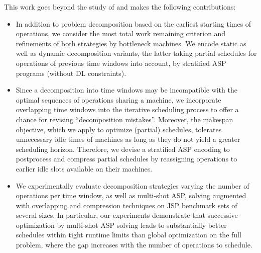 \documentclass{tlp} %
\begin{document}
This work goes beyond the study of \cite{elkgeb20a} and makes the following contributions:
\begin{itemize}
\item In addition to problem decomposition based on the earliest starting times
      of operations, we consider the most total work remaining criterion and
      refinements of both strategies by bottleneck machines.
      We encode static as well as dynamic decomposition variants, the latter taking
      partial schedules for operations of previous time windows into account, by stratified
      ASP programs (without DL constraints).
\item Since a decomposition into time windows may be incompatible with
      the optimal sequences of operations sharing a machine, we incorporate
      overlapping time windows into the iterative scheduling process to
      offer a chance for revising ``decomposition mistakes''.
      Moreover, the makespan objective, which we apply to optimize (partial) schedules, tolerates unnecessary idle times of machines as long as they do not yield a greater scheduling horizon. 
      Therefore, we devise a stratified ASP encoding to postprocess and compress partial schedules by reassigning operations to earlier idle slots available on their machines.
\item We experimentally evaluate decomposition strategies varying the number of
      operations per time window, as well as multi-shot ASP, solving
      augmented with overlapping and compression techniques
      on JSP benchmark sets of several sizes.
      In particular, our experiments demonstrate that successive optimization
      by multi-shot ASP solving leads to substantially better schedules within
      tight runtime limits than global optimization on the full problem,
      where the gap increases with the number of operations to schedule.
\end{itemize}

\end{document}
